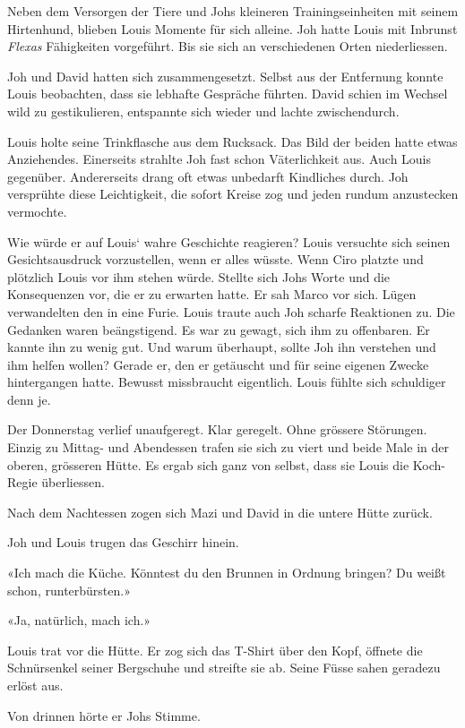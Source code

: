 Neben dem Versorgen der Tiere und Johs kleineren Trainingseinheiten mit
seinem Hirtenhund, blieben Louis Momente für sich alleine. Joh hatte
Louis mit Inbrunst \emph{Flexas} Fähigkeiten vorgeführt. Bis sie sich an
verschiedenen Orten niederliessen.

Joh und David hatten sich zusammengesetzt. Selbst aus der Entfernung
konnte Louis beobachten, dass sie lebhafte Gespräche führten. David
schien im Wechsel wild zu gestikulieren, entspannte sich wieder und
lachte zwischendurch.

Louis holte seine Trinkflasche aus dem Rucksack. Das Bild der beiden
hatte etwas Anziehendes. Einerseits strahlte Joh fast schon
Väterlichkeit aus. Auch Louis gegenüber. Andererseits drang oft etwas
unbedarft Kindliches durch. Joh versprühte diese Leichtigkeit, die
sofort Kreise zog und jeden rundum anzustecken vermochte.

Wie würde er auf Louis` wahre Geschichte reagieren? Louis versuchte sich
seinen Gesichtsausdruck vorzustellen, wenn er alles wüsste. Wenn Ciro
platzte und plötzlich Louis vor ihm stehen würde. Stellte sich Johs
Worte und die Konsequenzen vor, die er zu erwarten hatte. Er sah Marco
vor sich. Lügen verwandelten den in eine Furie. Louis traute auch Joh
scharfe Reaktionen zu. Die Gedanken waren beängstigend. Es war zu
gewagt, sich ihm zu offenbaren. Er kannte ihn zu wenig gut. Und warum
überhaupt, sollte Joh ihn verstehen und ihm helfen wollen? Gerade er,
den er getäuscht und für seine eigenen Zwecke hintergangen hatte.
Bewusst missbraucht eigentlich. Louis fühlte sich schuldiger denn je.

Der Donnerstag verlief unaufgeregt. Klar geregelt. Ohne grössere
Störungen. Einzig zu Mittag- und Abendessen trafen sie sich zu viert und
beide Male in der oberen, grösseren Hütte. Es ergab sich ganz von
selbst, dass sie Louis die Koch-Regie überliessen.

Nach dem Nachtessen zogen sich Mazi und David in die untere Hütte
zurück.

Joh und Louis trugen das Geschirr hinein.

«Ich mach die Küche. Könntest du den Brunnen in Ordnung bringen? Du
weißt schon, runterbürsten.»

«Ja, natürlich, mach ich.»

Louis trat vor die Hütte. Er zog sich das T-Shirt über den Kopf, öffnete
die Schnürsenkel seiner Bergschuhe und streifte sie ab. Seine Füsse
sahen geradezu erlöst aus.

Von drinnen hörte er Johs Stimme.

